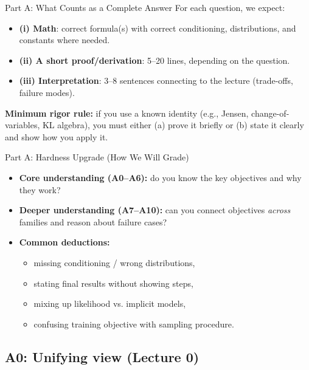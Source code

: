 \documentclass[aspectratio=169]{beamer}
\begin{document}
\begin{frame}{Part A: What Counts as a Complete Answer}
\small
For each question, we expect:
\begin{itemize}
  \item \textbf{(i) Math}: correct formula(s) with correct conditioning, distributions, and constants where needed.
  \item \textbf{(ii) A short proof/derivation}: 5--20 lines, depending on the question.
  \item \textbf{(iii) Interpretation}: 3--8 sentences connecting to the lecture (trade-offs, failure modes).
\end{itemize}
\vspace{0.4em}
\textbf{Minimum rigor rule:} if you use a known identity (e.g., Jensen, change-of-variables, KL algebra),
you must either (a) prove it briefly or (b) state it clearly and show how you apply it.
\end{frame}

\begin{frame}{Part A: Hardness Upgrade (How We Will Grade)}
\small
\begin{itemize}
  \item \textbf{Core understanding (A0--A6):} do you know the key objectives and why they work?
  \item \textbf{Deeper understanding (A7--A10):} can you connect objectives \emph{across} families and reason about failure cases?
  \item \textbf{Common deductions:}
  \begin{itemize}
    \item missing conditioning / wrong distributions,
    \item stating final results without showing steps,
    \item mixing up likelihood vs. implicit models,
    \item confusing training objective with sampling procedure.
  \end{itemize}
\end{itemize}
\end{frame}

\subsection{A0: Unifying view (Lecture 0)}
\end{document}
